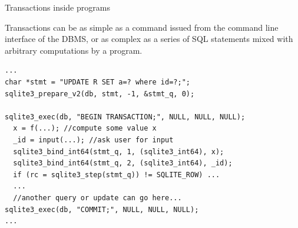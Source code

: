 
%
%
\begin{frame}[fragile]{Transactions inside programs}

Transactions can be as simple as a command issued from the command line interface of the DBMS, or as complex as a series of SQL statements mixed with arbitrary computations by a program.


\begin{lstlisting}[style=C]
...
char *stmt = "UPDATE R SET a=? where id=?;";
sqlite3_prepare_v2(db, stmt, -1, &stmt_q, 0);

sqlite3_exec(db, "BEGIN TRANSACTION;", NULL, NULL, NULL);
  x = f(...); //compute some value x
  _id = input(...); //ask user for input 
  sqlite3_bind_int64(stmt_q, 1, (sqlite3_int64), x);
  sqlite3_bind_int64(stmt_q, 2, (sqlite3_int64), _id);
  if (rc = sqlite3_step(stmt_q)) != SQLITE_ROW) ...
  ...
  //another query or update can go here...
sqlite3_exec(db, "COMMIT;", NULL, NULL, NULL);
...
\end{lstlisting}
\end{frame}

	

